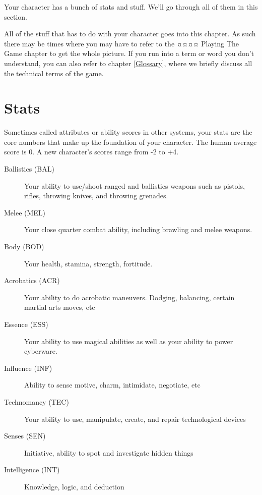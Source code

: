 
Your character has a bunch of stats and stuff. We’ll go through all of them in
this section.

All of the stuff that has to do with your character goes into this chapter. As
such there may be times where you may have to refer to the ¤¤¤¤ Playing The Game
chapter to get the whole picture. If you run into a term or word you don’t
understand, you can also refer to chapter \vref{Glossary}, where we briefly
discuss all the technical terms of the game.

\section{Stats}

Sometimes called attributes or ability scores in other systems, your stats are
the core numbers that make up the foundation of your character. The human
average score is 0. A new character's scores range from -2 to +4.

\begin{description}
\item[Ballistics (BAL)]
    Your ability to use/shoot ranged and ballistics weapons such as pistols,
    rifles, throwing knives, and throwing grenades.

\item[Melee (MEL)]
    Your close quarter combat ability, including brawling and melee weapons.

\item[Body (BOD)]
Your health, stamina, strength, fortitude.

\item[Acrobatics (ACR)]
Your ability to do acrobatic maneuvers. Dodging, balancing, certain martial arts moves, etc

\item[Essence (ESS)]
Your ability to use magical abilities as well as your ability to power cyberware.

\item[Influence (INF)]
Ability to sense motive, charm, intimidate, negotiate, etc

\item[Technomancy (TEC)]
Your ability to use, manipulate, create, and repair technological devices

\item[Senses (SEN)]
Initiative, ability to spot and investigate hidden things

\item[Intelligence (INT)]
Knowledge, logic, and deduction

\end{description}

